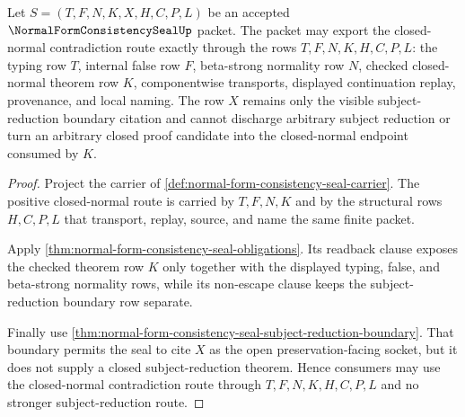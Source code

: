 \begin{theorem}
\label{thm:normal-form-consistency-seal-closed-normal-frontier}
Let $S=(T,F,N,K,X,H,C,P,L)$ be an accepted $\NormalFormConsistencySealUp$
packet. The packet may export the closed-normal contradiction route exactly
through the rows $T,F,N,K,H,C,P,L$: the typing row $T$, internal false row
$F$, beta-strong normality row $N$, checked closed-normal theorem row $K$,
componentwise transports, displayed continuation replay, provenance, and local
naming. The row $X$ remains only the visible subject-reduction boundary
citation and cannot discharge arbitrary subject reduction or turn an arbitrary
closed proof candidate into the closed-normal endpoint consumed by $K$.
\end{theorem}
\begin{proof}
Project the carrier of
\autoref{def:normal-form-consistency-seal-carrier}. The positive
closed-normal route is carried by $T,F,N,K$ and by the structural rows
$H,C,P,L$ that transport, replay, source, and name the same finite packet.

Apply \autoref{thm:normal-form-consistency-seal-obligations}. Its readback
clause exposes the checked theorem row $K$ only together with the displayed
typing, false, and beta-strong normality rows, while its non-escape clause
keeps the subject-reduction boundary row separate.

Finally use
\autoref{thm:normal-form-consistency-seal-subject-reduction-boundary}. That
boundary permits the seal to cite $X$ as the open preservation-facing socket,
but it does not supply a closed subject-reduction theorem. Hence consumers may
use the closed-normal contradiction route through $T,F,N,K,H,C,P,L$ and no
stronger subject-reduction route.
\end{proof}

